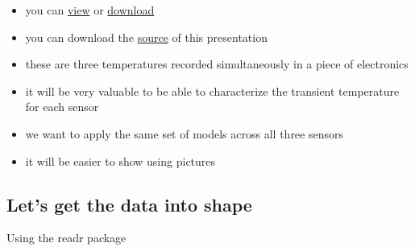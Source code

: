 \documentclass[]{book}
\newenvironment{Shaded}{\begin{snugshade}}{\end{snugshade}}
\newcommand{\CommentTok}[1]{\textcolor[rgb]{0.56,0.35,0.01}{\textit{#1}}}
\newcommand{\KeywordTok}[1]{\textcolor[rgb]{0.13,0.29,0.53}{\textbf{#1}}}
\newcommand{\NormalTok}[1]{#1}
\newcommand{\OperatorTok}[1]{\textcolor[rgb]{0.81,0.36,0.00}{\textbf{#1}}}
\newcommand{\StringTok}[1]{\textcolor[rgb]{0.31,0.60,0.02}{#1}}
\begin{document}
\begin{itemize}
\item
  you can \href{https://github.com/ijlyttle/isugg_purrr/blob/gh-pages/temperature.csv}{view} or \href{http://ijlyttle.github.io/isugg_purrr/temperature.csv}{download}
\item
  you can download the \href{http://ijlyttle.github.io/isugg_purrr/presentation.Rmd}{source} of this presentation
\item
  these are three temperatures recorded simultaneously in a piece of electronics
\item
  it will be very valuable to be able to characterize the transient temperature for each sensor
\item
  we want to apply the same set of models across all three sensors
\item
  it will be easier to show using pictures
\end{itemize}

\hypertarget{lets-get-the-data-into-shape}{%
\subsection{Let's get the data into shape}\label{lets-get-the-data-into-shape}}

Using the readr package

\begin{Shaded}
\end{Shaded}
\end{document}
